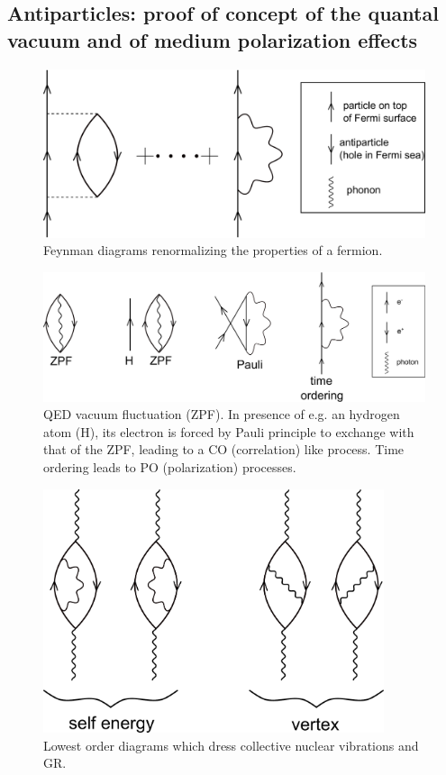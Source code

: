 \begin{subappendices}
\section[Vacuum and medium polarization]{Antiparticles: proof of concept of the quantal vacuum and of medium polarization effects}\label{C6AppCx}
 \begin{figure}
\centerline{\includegraphics*[width=13cm,angle=0]{C6/figs_C6/fig6_C1x}}
\caption{Feynman diagrams renormalizing the properties of a fermion.}\label{fig6_C1x}
\end{figure}
 \begin{figure}
	\centerline{\includegraphics*[width=15cm,angle=0]{C6/figs_C6/fig6_C2x}}
\caption{QED vacuum fluctuation (ZPF). In presence of e.g. an 	hydrogen atom (H), its electron is forced by Pauli principle to exchange with that of the ZPF, leading to a  CO (correlation) like process. Time ordering leads to PO (polarization) processes.}\label{fig6_C2x}
\end{figure}
 \begin{figure}
\centerline{\includegraphics*[width=10cm,angle=0]{C6/figs_C6/fig6_C3x}}
\caption{Lowest order diagrams which dress collective nuclear vibrations and GR.}\label{fig6_C3x}
\end{figure}


\end{subappendices}
